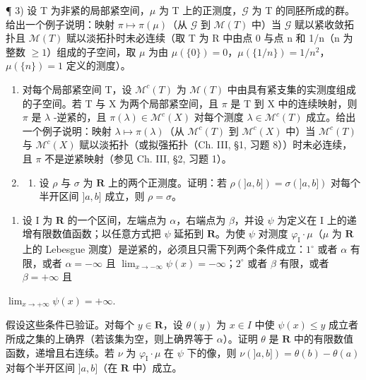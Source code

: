 ¶ 3) 设 T 为非紧的局部紧空间，\(\mu\) 为 T 上的正测度，\(\mathcal{G}\) 为 T 的同胚所成的群。给出一个例子说明：映射 \(\pi \mapsto \pi(\mu)\)（从 \(\mathcal{G}\) 到 \(\mathcal{M}(T)\) 中）当 \(\mathcal{G}\) 赋以紧收敛拓扑且 \(\mathcal{M}(T)\) 赋以淡拓扑时未必连续（取 T 为 R 中由点 0 与点 n 和 1/n（n 为整数 \(\geqslant 1\)）组成的子空间，取 \(\mu\) 为由 \(\mu(\{0\}) = 0\)，\(\mu(\{1/n\}) = 1/n^2\)，\(\mu(\{n\}) = 1\) 定义的测度）。

\begin{enumerate}
\def\labelenumi{\arabic{enumi})}
\setcounter{enumi}{3}
\item
  对每个局部紧空间 T，设 \(\mathcal{M}^{c}(T)\) 为 \(\mathcal{M}(T)\) 中由具有紧支集的实测度组成的子空间。若 T 与 X 为两个局部紧空间，且 \(\pi\) 是 T 到 X 中的连续映射，则 \(\pi\) 是 \(\lambda\) -逆紧的，且 \(\pi(\lambda) \in \mathcal{M}^{c}(X)\) 对每个测度 \(\lambda \in \mathcal{M}^{c}(T)\) 成立。给出一个例子说明：映射 \(\lambda \mapsto \pi(\lambda)\)（从 \(\mathcal{M}^{c}(T)\) 到 \(\mathcal{M}^{c}(X)\) 中）当 \(\mathcal{M}^{c}(T)\) 与 \(\mathcal{M}^{c}(X)\) 赋以淡拓扑（或拟强拓扑（Ch. III, §1, 习题 8））时未必连续，且 \(\pi\) 不是逆紧映射（参见 Ch. III, §2, 习题 1）。
\item
  \begin{enumerate}
  \def\labelenumii{\alph{enumii})}
  \tightlist
  \item
    设 \(\rho\) 与 \(\sigma\) 为 \(\mathbf{R}\) 上的两个正测度。证明：若 \(\rho(]a,b]) = \sigma(]a,b])\) 对每个半开区间 \(]a,b]\) 成立，则 \(\rho = \sigma\)。
  \end{enumerate}
\end{enumerate}

\begin{enumerate}
\def\labelenumi{\alph{enumi})}
\setcounter{enumi}{1}
\tightlist
\item
  设 I 为 \(\mathbf{R}\) 的一个区间，左端点为 \(\alpha\)，右端点为 \(\beta\)，并设 \(\psi\) 为定义在 I 上的递增有限数值函数；以任意方式把 \(\psi\) 延拓到 \(\mathbf{R}\)。为使 \(\psi\) 对测度 \(\varphi_{\mathrm{I}} \cdot \mu\)（\(\mu\) 为 \(\mathbf{R}\) 上的 Lebesgue 测度）是逆紧的，必须且只需下列两个条件成立：\(1^{\circ}\) 或者 \(\alpha\) 有限，或者 \(\alpha = -\infty\) 且 \(\lim_{x \to -\infty} \psi(x) = -\infty\)；\(2^{\circ}\) 或者 \(\beta\) 有限，或者 \(\beta = +\infty\) 且
\end{enumerate}

\(\lim_{x\to +\infty}\psi (x) = +\infty .\)

假设这些条件已验证。对每个 \(y \in \mathbf{R}\)，设 \(\theta(y)\) 为 \(x \in I\) 中使 \(\psi(x) \leqslant y\) 成立者所成之集的上确界（若该集为空，则上确界等于 \(\alpha\)）。证明 \(\theta\) 是 \(\mathbf{R}\) 中的有限数值函数，递增且右连续。若 \(\nu\) 为 \(\varphi_{\mathrm{I}} \cdot \mu\) 在 \(\psi\) 下的像，则 \(\nu(]a,b]) = \theta(b) - \theta(a)\) 对每个半开区间 \(]a,b]\)（在 \(\mathbf{R}\) 中）成立。

